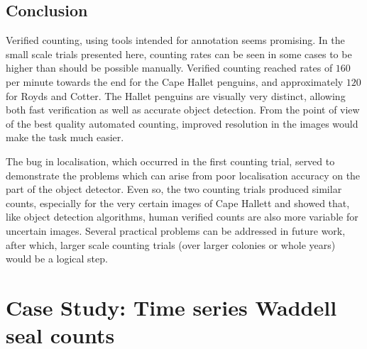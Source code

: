 \subsection{Conclusion}
\label{sec:penguin_conclusion}

Verified counting, using tools intended for annotation seems promising. In the small scale trials presented here, counting rates can be seen in some cases to be higher than should be possible manually. Verified counting reached rates of $160$ per minute towards the end for the Cape Hallet penguins, and approximately $120$ for Royds and Cotter. The Hallet penguins are visually very distinct, allowing both fast verification as well as accurate object detection. From the point of view of the best quality automated counting, improved resolution in the images would make the task much easier. 

The bug in localisation, which occurred in the first counting trial, served to demonstrate the problems which can arise from poor localisation accuracy on the part of the object detector. Even so, the two counting trials produced similar counts, especially for the very certain images of Cape Hallett and showed that, like object detection algorithms, human verified counts are also more variable for uncertain images. Several practical problems can be addressed in future work, after which, larger scale counting trials (over larger colonies or whole years) would be a logical step.

\section{Case Study: Time series Waddell seal counts}
\label{sec:case_seals}



